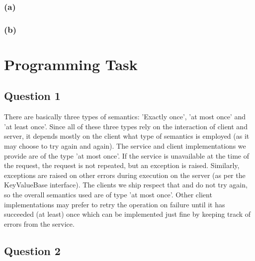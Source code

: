 \documentclass[12pt,a4paper]{article}
\newcommand{\code}[1]{{\fontfamily{fvm}\small \selectfont #1}}
\begin{document}
\subsubsection*{(a)}



\subsubsection*{(b)}

\section*{Programming Task}
\label{sec:programming}

\subsection*{Question 1}
\label{sec:pq1}
There are basically three types of semantics: 'Exactly once', 'at most once' and 'at least once'. Since all of these three types rely on the interaction of client and server, it depends mostly on the client what type of semantics is employed (as it may choose to try again and again). The service and client implementations we provide are of the type 'at most once'. If the service is unavailable at the time of the request, the request is not repeated, but an exception is raised. Similarly, exceptions are raised on other errors during execution on the server (as per the \code{KeyValueBase} interface). The clients we ship respect that and do not try again, so the overall semantics used are of type 'at most once'. Other client implementations may prefer to retry the operation on failure until it has succeeded (at least) once which can be implemented just fine by keeping track of errors from the service.

\subsection*{Question 2}
\label{sec:pq2}
\end{document}
